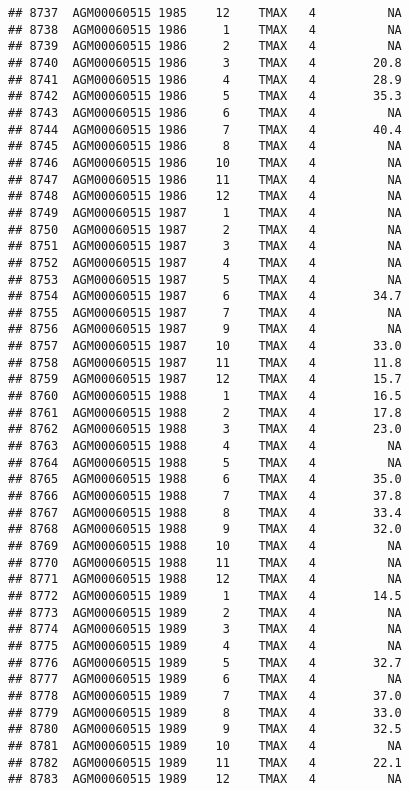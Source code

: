 \documentclass{article}\usepackage[]{graphicx}\usepackage[]{color}
\makeatletter
\newenvironment{kframe}{%
 \def\at@end@of@kframe{}%
 \ifinner\ifhmode%
  \def\at@end@of@kframe{\end{minipage}}%
  \begin{minipage}{\columnwidth}%
 \fi\fi%
 \def\FrameCommand##1{\hskip\@totalleftmargin \hskip-\fboxsep
 \colorbox{shadecolor}{##1}\hskip-\fboxsep
     \hskip-\linewidth \hskip-\@totalleftmargin \hskip\columnwidth}%
 \MakeFramed {\advance\hsize-\width
   \@totalleftmargin\z@ \linewidth\hsize
   \@setminipage}}%
 {\par\unskip\endMakeFramed%
 \at@end@of@kframe}
\newenvironment{knitrout}{}{} %
\makeatother
\begin{document}
\begin{knitrout}
\begin{kframe}
\begin{verbatim}
## 8737  AGM00060515 1985    12    TMAX   4          NA
## 8738  AGM00060515 1986     1    TMAX   4          NA
## 8739  AGM00060515 1986     2    TMAX   4          NA
## 8740  AGM00060515 1986     3    TMAX   4        20.8
## 8741  AGM00060515 1986     4    TMAX   4        28.9
## 8742  AGM00060515 1986     5    TMAX   4        35.3
## 8743  AGM00060515 1986     6    TMAX   4          NA
## 8744  AGM00060515 1986     7    TMAX   4        40.4
## 8745  AGM00060515 1986     8    TMAX   4          NA
## 8746  AGM00060515 1986    10    TMAX   4          NA
## 8747  AGM00060515 1986    11    TMAX   4          NA
## 8748  AGM00060515 1986    12    TMAX   4          NA
## 8749  AGM00060515 1987     1    TMAX   4          NA
## 8750  AGM00060515 1987     2    TMAX   4          NA
## 8751  AGM00060515 1987     3    TMAX   4          NA
## 8752  AGM00060515 1987     4    TMAX   4          NA
## 8753  AGM00060515 1987     5    TMAX   4          NA
## 8754  AGM00060515 1987     6    TMAX   4        34.7
## 8755  AGM00060515 1987     7    TMAX   4          NA
## 8756  AGM00060515 1987     9    TMAX   4          NA
## 8757  AGM00060515 1987    10    TMAX   4        33.0
## 8758  AGM00060515 1987    11    TMAX   4        11.8
## 8759  AGM00060515 1987    12    TMAX   4        15.7
## 8760  AGM00060515 1988     1    TMAX   4        16.5
## 8761  AGM00060515 1988     2    TMAX   4        17.8
## 8762  AGM00060515 1988     3    TMAX   4        23.0
## 8763  AGM00060515 1988     4    TMAX   4          NA
## 8764  AGM00060515 1988     5    TMAX   4          NA
## 8765  AGM00060515 1988     6    TMAX   4        35.0
## 8766  AGM00060515 1988     7    TMAX   4        37.8
## 8767  AGM00060515 1988     8    TMAX   4        33.4
## 8768  AGM00060515 1988     9    TMAX   4        32.0
## 8769  AGM00060515 1988    10    TMAX   4          NA
## 8770  AGM00060515 1988    11    TMAX   4          NA
## 8771  AGM00060515 1988    12    TMAX   4          NA
## 8772  AGM00060515 1989     1    TMAX   4        14.5
## 8773  AGM00060515 1989     2    TMAX   4          NA
## 8774  AGM00060515 1989     3    TMAX   4          NA
## 8775  AGM00060515 1989     4    TMAX   4          NA
## 8776  AGM00060515 1989     5    TMAX   4        32.7
## 8777  AGM00060515 1989     6    TMAX   4          NA
## 8778  AGM00060515 1989     7    TMAX   4        37.0
## 8779  AGM00060515 1989     8    TMAX   4        33.0
## 8780  AGM00060515 1989     9    TMAX   4        32.5
## 8781  AGM00060515 1989    10    TMAX   4          NA
## 8782  AGM00060515 1989    11    TMAX   4        22.1
## 8783  AGM00060515 1989    12    TMAX   4          NA

\end{verbatim}
\end{kframe}
\end{knitrout}
\end{document}
